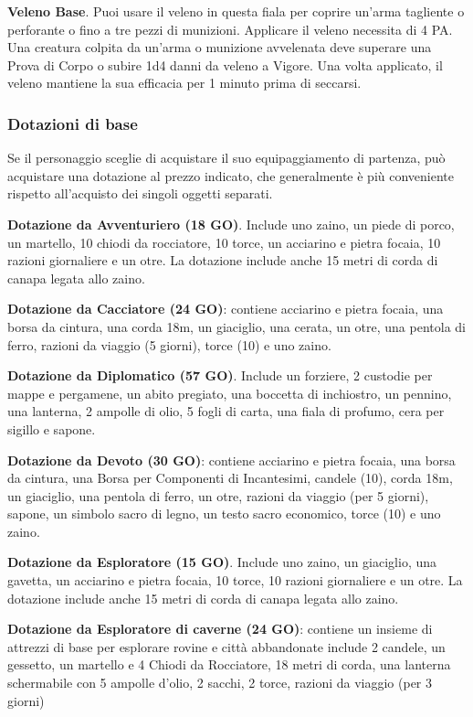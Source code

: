 \documentclass[12pt,a4paper,twoside,openany]{book}
\begin{document}
\begin{multicols}{2}
\textbf{Veleno Base}. Puoi usare il veleno in questa fiala per coprire un’arma tagliente o perforante o fino a tre pezzi di munizioni. Applicare il veleno necessita di 4 PA. Una creatura colpita da un’arma o munizione avvelenata deve superare una Prova di Corpo o subire 1d4 danni da veleno a Vigore.
Una volta applicato, il veleno mantiene la sua efficacia per 1 minuto prima di seccarsi.

\subsubsection{Dotazioni di base}
Se il personaggio sceglie di acquistare il suo equipaggiamento di partenza, può acquistare una dotazione al prezzo indicato, che generalmente è più conveniente rispetto all'acquisto dei singoli oggetti separati.

\textbf{Dotazione da Avventuriero (18 GO)}. Include uno zaino, un piede di porco, un martello, 10 chiodi da rocciatore, 10 torce, un acciarino e pietra focaia, 10 razioni giornaliere e un otre. La dotazione include anche 15 metri di corda di canapa legata allo zaino.

\textbf{Dotazione da Cacciatore (24 GO)}: contiene acciarino e pietra focaia, una borsa da cintura, una corda 18m, un giaciglio, una cerata, un otre, una pentola di ferro, razioni da viaggio (5 giorni), torce (10) e uno zaino.

\textbf{Dotazione da Diplomatico (57 GO)}. Include un forziere, 2 custodie per mappe e pergamene, un abito pregiato, una boccetta di inchiostro, un pennino, una lanterna, 2 ampolle di olio, 5 fogli di carta, una fiala di profumo, cera per sigillo e sapone.


\textbf{Dotazione da Devoto (30 GO)}: contiene acciarino e pietra focaia, una borsa da cintura, una Borsa per Componenti di Incantesimi, candele (10), corda 18m, un giaciglio, una pentola di ferro, un otre, razioni da viaggio (per 5 giorni), sapone, un simbolo sacro di legno, un testo sacro economico, torce (10) e uno zaino.

\textbf{Dotazione da Esploratore (15 GO)}. Include uno zaino, un giaciglio, una gavetta, un acciarino e pietra focaia, 10 torce, 10 razioni giornaliere e un otre. La dotazione include anche 15 metri di corda di canapa legata allo zaino.

\textbf{Dotazione da Esploratore di caverne (24 GO)}: contiene un insieme di attrezzi di base per esplorare rovine e città abbandonate include 2 candele, un gessetto, un martello e 4 Chiodi da Rocciatore, 18 metri di corda, una lanterna schermabile con 5 ampolle d'olio, 2 sacchi, 2 torce, razioni da viaggio (per 3 giorni)


\end{multicols}
\end{document}
